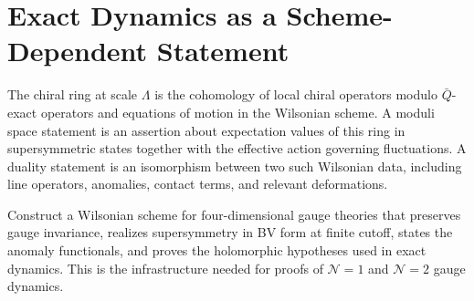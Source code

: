 \section{Exact Dynamics as a Scheme-Dependent Statement}

The chiral ring at scale \(\Lambda\) is the cohomology of local chiral
operators modulo \(\bar Q\)-exact operators and equations of motion in the
Wilsonian scheme.  A moduli space statement is an assertion about expectation
values of this ring in supersymmetric states together with the effective
action governing fluctuations.  A duality statement is an isomorphism between
two such Wilsonian data, including line operators, anomalies, contact terms,
and relevant deformations.

\begin{openproblem}
\label{op:susy-wilsonian-construction}
Construct a Wilsonian scheme for four-dimensional gauge theories that
preserves gauge invariance, realizes supersymmetry in BV form at finite
cutoff, states the anomaly functionals, and proves the holomorphic hypotheses
used in exact dynamics.  This is the infrastructure needed for proofs of
\(\mathcal N=1\) and \(\mathcal N=2\) gauge dynamics.
\end{openproblem}
